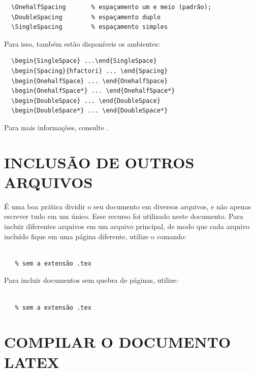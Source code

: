 \begin{verbatim}
  \OnehalfSpacing       % espaçamento um e meio (padrão); 
  \DoubleSpacing        % espaçamento duplo
  \SingleSpacing        % espaçamento simples	
\end{verbatim}

Para isso, também estão disponíveis os ambientes:

\begin{verbatim}
  \begin{SingleSpace} ...\end{SingleSpace}
  \begin{Spacing}{hfactori} ... \end{Spacing}
  \begin{OnehalfSpace} ... \end{OnehalfSpace}
  \begin{OnehalfSpace*} ... \end{OnehalfSpace*}
  \begin{DoubleSpace} ... \end{DoubleSpace}
  \begin{DoubleSpace*} ... \end{DoubleSpace*} 
\end{verbatim}

Para mais informações, consulte .

\section{\uppercase{Inclusão de outros arquivos}\label{sec-include}}

É uma boa prática dividir o seu documento em diversos arquivos, e não
apenas escrever tudo em um único. Esse recurso foi utilizado neste
documento. Para incluir diferentes arquivos em um arquivo principal,
de modo que cada arquivo incluído fique em uma página diferente, utilize o
comando:

\begin{verbatim}
    
   % sem a extensão .tex
\end{verbatim}

Para incluir documentos sem quebra de páginas, utilize:

\begin{verbatim}
    
   % sem a extensão .tex
\end{verbatim}

\section{\uppercase{Compilar o documento \LaTeX}}

